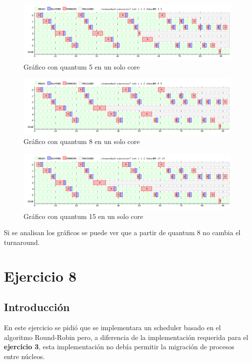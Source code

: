 \documentclass[a4paper,11pt]{article}
\begin{document}
\begin{figure}[H]
\centering
\includegraphics[scale=.6, width=1\textwidth]{graficos/ej7-1core-q2}
\caption{Gráfico con quantum 5 en un solo core}
\end{figure}

\begin{figure}[H]
\centering
\includegraphics[scale=.6, width=1\textwidth]{graficos/ej7-1core-q3}
\caption{Gráfico con quantum 8 en un solo core}
\end{figure}

\begin{figure}[H]
\centering
\includegraphics[scale=.6, width=1\textwidth]{graficos/ej7-1core-q4}
\caption{Gráfico con quantum 15 en un solo core}
\end{figure}

Si se analisan los gráficos se puede ver que a partir de quantum 8 no cambia el turnaround.

\pagebreak

\section{Ejercicio 8}
	\subsection{Introducci\'on}
		En este ejercicio se pidió que se implementara un scheduler basado en el algoritmo Round-Robin pero, a diferencia de la implementación requerida para el \textbf{ejercicio 3}, esta implementación no debía permitir la migración de procesos entre núcleos.
		
\end{document}
